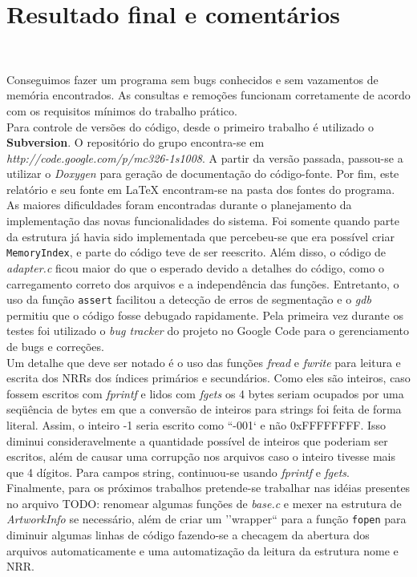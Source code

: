 \documentclass{article}
\begin{document}
\section{Resultado final e comentários}\

Conseguimos fazer um programa sem bugs conhecidos e sem vazamentos de memória encontrados. As consultas e remoções funcionam corretamente de acordo com os requisitos mínimos do trabalho prático.\\

Para controle de versões do código, desde o primeiro trabalho é utilizado o \textbf{Subversion}. O repositório do grupo encontra-se em \textit{http://code.google.com/p/mc326-1s1008}. A partir da versão passada, passou-se a utilizar o \textit{Doxygen} para geração de documentação do código-fonte. Por fim, este relatório e seu fonte em LaTeX encontram-se na pasta dos fontes do programa.\\

As maiores dificuldades foram encontradas durante o planejamento da implementação das novas funcionalidades do sistema. Foi somente quando parte da estrutura já havia sido implementada que percebeu-se que era possível criar \texttt{MemoryIndex}, e parte do código teve de ser reescrito. Além disso, o código de \textit{adapter.c} ficou maior do que o esperado devido a detalhes do código, como o carregamento correto dos arquivos e a independência das funções. Entretanto, o uso da função \texttt{assert} facilitou a detecção de erros de segmentação e o \textit{gdb} permitiu que o código fosse debugado rapidamente. Pela primeira vez durante os testes foi utilizado o \textit{bug tracker} do projeto no Google Code para o gerenciamento de bugs e correções.\\

Um detalhe que deve ser notado é o uso das funções \textit{fread} e \textit{fwrite} para leitura e escrita dos NRRs dos índices primários e secundários. Como eles são inteiros, caso fossem escritos com \textit{fprintf} e lidos com \textit{fgets} os 4 bytes seriam ocupados por uma seqüência de bytes em que a conversão de inteiros para strings foi feita de forma literal. Assim, o inteiro -1 seria escrito como ``-001` e não 0xFFFFFFFF. Isso diminui consideravelmente a quantidade possível de inteiros que poderiam ser escritos, além de causar uma corrupção nos arquivos caso o inteiro tivesse mais que 4 dígitos. Para campos string, continuou-se usando \textit{fprintf} e \textit{fgets}.\\

Finalmente, para os próximos trabalhos pretende-se trabalhar nas idéias presentes no arquivo TODO: renomear algumas funções de \textit{base.c} e mexer na estrutura de \textit{ArtworkInfo} se necessário, além de criar um ''wrapper`` para a função \texttt{fopen} para diminuir algumas linhas de código fazendo-se a checagem da abertura dos arquivos automaticamente e uma automatização da leitura da estrutura nome e NRR.
\end{document}
